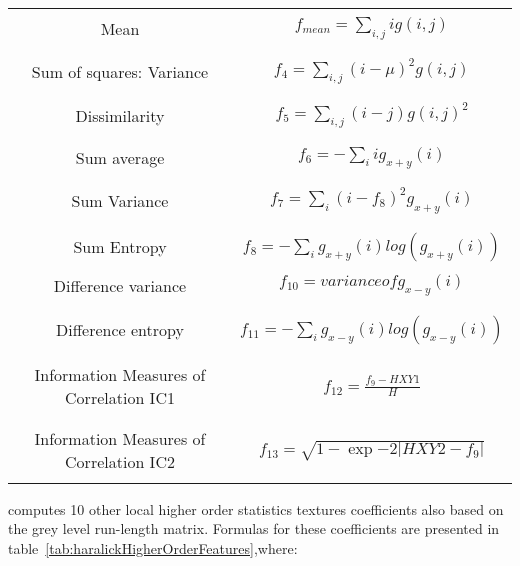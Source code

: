 \begin{table}
\begin{center}
\begin{tabular}[h!]{|c|c|}
\hline
& \\
Mean & $ f_{mean} = \sum_{i, j}i g(i, j) $ \\
& \\
\hline
& \\
Sum of squares: Variance & $ f_4 = \sum_{i, j}(i - \mu)^2 g(i, j) $ \\
& \\
\hline
& \\
Dissimilarity & $ f_5 = \sum_{i, j}(i - j) g(i, j)^2 $ \\
& \\
\hline
& \\
Sum average &  $ f_6 = -\sum_{i}i g_{x+y}(i) $ \\
& \\
\hline
& \\
Sum Variance & $ f_7 = \sum_{i}(i - f_8)^2 g_{x+y}(i) $ \\
& \\
\hline
& \\
Sum Entropy & $ f_8 = -\sum_{i}g_{x+y}(i) log (g_{x+y}(i)) $ \\
& \\
\hline
Difference variance & $ f_{10} = variance of g_{x-y}(i) $ \\
& \\
\hline
& \\
Difference entropy & $ f_{11} = -\sum_{i}g_{x-y}(i) log (g_{x-y}(i)) $ \\
& \\
\hline
& \\
Information Measures of Correlation IC1 & $ f_{12} = \frac{f_9 - HXY1}{H} $ \\
& \\
\hline
& \\
Information Measures of Correlation IC2 & $ f_{13} = \sqrt{1 - \exp{-2}|HXY2 - f_9|} $ \\
& \\
\hline
\end{tabular}
\end{center}
\label{tab:haralickAdvancedFeatures}
\end{table}

 computes 10
other local higher order statistics textures coefficients also based on the grey
level run-length matrix. Formulas for these coefficients are presented in
table~\ref{tab:haralickHigherOrderFeatures},where:

